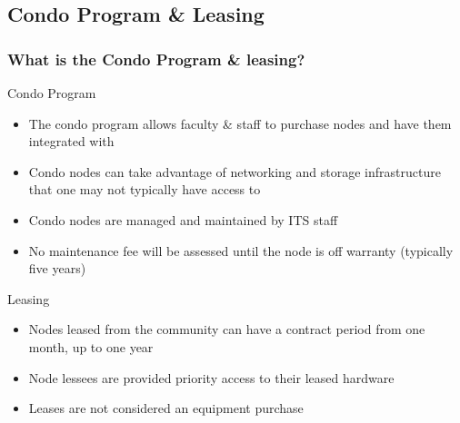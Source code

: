 \subsection{Condo Program \& Leasing}
\begin{frame}
  \frametitle{What is the Condo Program \& leasing?}
	\begin{block}{Condo Program}\scriptsize
		\begin{itemize}
		\item The condo program allows faculty \& staff to purchase nodes and have them integrated with {\mana}
		\item Condo nodes can take advantage of networking and storage infrastructure that one may not typically have access to
		\item Condo nodes are managed and maintained by ITS staff
		\item No maintenance fee will be assessed until the node is off warranty (typically five years)
		\end{itemize}
	\end{block}
	\begin{block}{Leasing}\scriptsize
		\begin{itemize}
		\item Nodes leased from the community can have a contract period from one month, up to one year
		\item Node lessees are provided priority access to their leased hardware
		\item Leases are not considered an equipment purchase
		\end{itemize}
	\end{block}
\end{frame}


